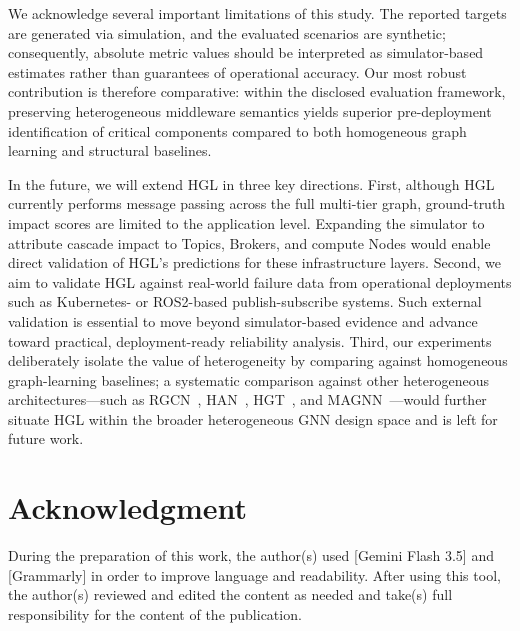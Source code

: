 \documentclass[sigconf,9pt,anonymous]{acmart}
\begin{document}
We acknowledge several important limitations of this study. The reported targets are generated via simulation, and the evaluated scenarios are synthetic; consequently, absolute metric values should be interpreted as simulator-based estimates rather than guarantees of operational accuracy. Our most robust contribution is therefore comparative: within the disclosed evaluation framework, preserving heterogeneous middleware semantics yields superior pre-deployment identification of critical components compared to both homogeneous graph learning and structural baselines.

In the future, we will extend HGL in three key directions. First, although HGL currently performs message passing across the full multi-tier graph, ground-truth impact scores are limited to the application level. Expanding the simulator to attribute cascade impact to Topics, Brokers, and compute Nodes would enable direct validation of HGL's predictions for these infrastructure layers. Second, we aim to validate HGL against real-world failure data from operational deployments such as Kubernetes- or ROS2-based publish-subscribe systems. Such external validation is essential to move beyond simulator-based evidence and advance toward practical, deployment-ready reliability analysis. Third, our experiments deliberately isolate the value of heterogeneity by comparing against homogeneous graph-learning baselines; a systematic comparison against other heterogeneous architectures—such as RGCN~\cite{schlichtkrull2018rgcn}, HAN~\cite{wang2019han}, HGT~\cite{hu2020hgt}, and MAGNN~\cite{fu2020magnn}—would further situate HGL within the broader heterogeneous GNN design space and is left for future work.

\section*{Acknowledgment}
During the preparation of this work, the author(s) used [Gemini Flash 3.5] and [Grammarly] in order to improve language and readability. After using this tool, the author(s) reviewed and edited the content as needed and take(s) full responsibility for the content of the publication.
\end{document}
